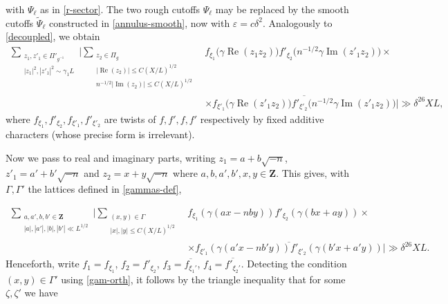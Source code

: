 \documentclass[11pt,reqno]{amsart}
\numberwithin{equation}{section}
\theoremstyle{definition}
\theoremstyle{remark}
\newcommand{\ol}{\overline}
\newcommand{\on}{\operatorname}
\newcommand{\eps}{\varepsilon}
\renewcommand{\le}{\leqslant}
\renewcommand{\Re}{\on{Re}}
\renewcommand{\Im}{\on{Im}}
\newcommand\Z{\mathbf{Z}}
\begin{document}
with $\Psi_{\ell}$ as in \cref{r-sector}. The two rough cutoffs $\Psi_{\ell}$ may be replaced by the smooth cutoffs $\tilde \Psi_{\ell}$ constructed in \cref{annulus-smooth}, now with $\eps = c \delta^2$. Analogously to \cref{decoupled}, we obtain 
\begin{align*} \sum_{\substack{z_1, z'_1 \in \Pi'_{g^{-1}} \\ |z_1|^2, |z'_1|^2\sim \gamma_1 L}}  \Big|  \sum_{\substack{z_2 \in \Pi_g \\ |\Re(z_2)| \le  C(X/L)^{1/2} \\  n^{-1/2}|\Im(z_2)| \le C(X/L)^{1/2}}} &  f_{\xi_1}\big(\gamma \Re (z_1 z_2)\big) f'_{\xi_2}\big( n^{-1/2}\gamma  \Im ( z'_1 z_2)\big) \times \\ & \times \overline{f_{\xi'_1}\big(\gamma \Re (z'_1 z_2)\big) f'_{\xi'_2}\big( n^{-1/2}\gamma  \Im ( z'_1 z_2)\big)} \Big| \gg \delta^{26} XL,\end{align*} where $f_{\xi_1}, f'_{\xi_2}, f_{\xi'_1}, f'_{\xi'_2}$ are twists of $f, f', f, f'$ respectively by fixed additive characters (whose precise form is irrelevant). 

Now we pass to real and imaginary parts, writing $z_1 =a + b \sqrt{-n}$, $z'_1 =a' + b' \sqrt{-n}$ and $z_2 = x + y \sqrt{-n}$ where $a,b,a', b',x,y \in \Z$. This gives, with $\Gamma, \Gamma'$ the lattices defined in \cref{gammas-def},

\begin{align*} \sum_{ \substack{a,a', b,b' \in \Z \\ |a|,|a'|, |b|, |b'| \ll L^{1/2}}} \Big|\sum_{\substack{(x,y)\in \Gamma \\ |x|, |y| \le C(X/L)^{1/2}}} & f_{\xi_1}(\gamma(ax - nby)) f'_{\xi_2}(\gamma(bx + ay))  \times \\ & \times  \overline{f_{\xi'_1}(\gamma(a'x - nb'y)) f'_{\xi'_2}(\gamma(b'x + a'y))}  \Big| \gg \delta^{26} XL.\end{align*}
Henceforth, write $f_1 = f_{\xi_1}$, $f_2 = f'_{\xi_2}$, $f_3 = \ol{f_{\xi_1'}}$, $f_4 = \ol{f'_{\xi_2'}}$. Detecting the condition $(x,y) \in \Gamma'$ using \cref{gam-orth}, it follows by the triangle inequality that for some $\zeta, \zeta'$ we have
\end{document}
